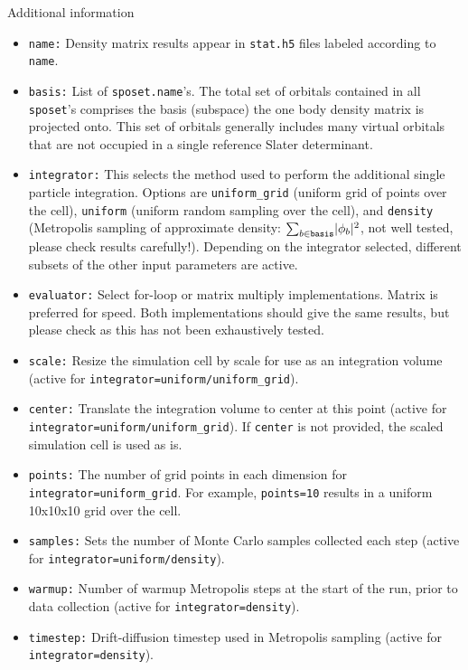 Additional information
\begin{itemize}
  \item{\texttt{name:} Density matrix results appear in \texttt{stat.h5} files labeled according to \texttt{name}.}
  \item{\texttt{basis:} List of \texttt{sposet.name}'s.  The total set of orbitals contained in all \texttt{sposet}'s comprises the basis (subspace) the one body density matrix is projected onto.  This set of orbitals generally includes many virtual orbitals that are not occupied in a single reference Slater determinant.}
  \item{\texttt{integrator:} This selects the method used to perform the additional single particle integration.  Options are \texttt{uniform\_grid} (uniform grid of points over the cell), \texttt{uniform} (uniform random sampling over the cell), and \texttt{density} (Metropolis sampling of approximate density: $\sum_{b\in \texttt{basis}}\lvert \phi_b \rvert^2$, not well tested, please check results carefully!)}.  Depending on the integrator selected, different subsets of the other input parameters are active.
  \item{\texttt{evaluator:} Select for-loop or matrix multiply implementations.  Matrix is preferred for speed.  Both implementations should give the same results, but please check as this has not been exhaustively tested.}
  \item{\texttt{scale:} Resize the simulation cell by scale for use as an integration volume (active for \texttt{integrator=uniform/uniform\_grid}).}
  \item{\texttt{center:} Translate the integration volume to center at this point (active for \texttt{integrator=uniform/uniform\_grid}). If \texttt{center} is not provided, the scaled simulation cell is used as is. }
  \item{\texttt{points:} The number of grid points in each dimension for \texttt{integrator=uniform\_grid}.  For example, \texttt{points=10} results in a uniform 10x10x10 grid over the cell.}
  \item{\texttt{samples:} Sets the number of Monte Carlo samples collected each step (active for \texttt{integrator=uniform/density}).  }
  \item{\texttt{warmup:} Number of warmup Metropolis steps at the start of the run, prior to data collection (active for \texttt{integrator=density}). }
  \item{\texttt{timestep:} Drift-diffusion timestep used in Metropolis sampling (active for \texttt{integrator=density}).}

\end{itemize}

